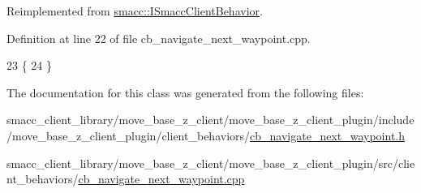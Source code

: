 Reimplemented from \hyperlink{classsmacc_1_1ISmaccClientBehavior_ad1198fdb2cbdf11f3276d3e23d4c0a50}{smacc\+::\+I\+Smacc\+Client\+Behavior}.



Definition at line 22 of file cb\+\_\+navigate\+\_\+next\+\_\+waypoint.\+cpp.


\begin{DoxyCode}
23     \{
24     \}
\end{DoxyCode}


The documentation for this class was generated from the following files\+:\begin{DoxyCompactItemize}
\item 
smacc\+\_\+client\+\_\+library/move\+\_\+base\+\_\+z\+\_\+client/move\+\_\+base\+\_\+z\+\_\+client\+\_\+plugin/include/move\+\_\+base\+\_\+z\+\_\+client\+\_\+plugin/client\+\_\+behaviors/\hyperlink{cb__navigate__next__waypoint_8h}{cb\+\_\+navigate\+\_\+next\+\_\+waypoint.\+h}\item 
smacc\+\_\+client\+\_\+library/move\+\_\+base\+\_\+z\+\_\+client/move\+\_\+base\+\_\+z\+\_\+client\+\_\+plugin/src/client\+\_\+behaviors/\hyperlink{cb__navigate__next__waypoint_8cpp}{cb\+\_\+navigate\+\_\+next\+\_\+waypoint.\+cpp}\end{DoxyCompactItemize}
